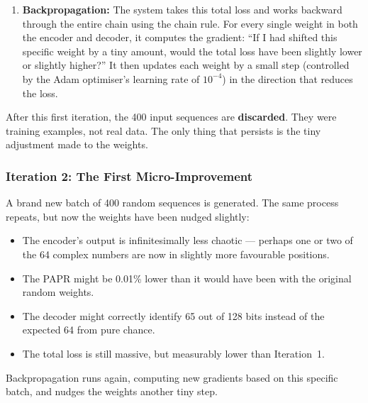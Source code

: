 \begin{enumerate}
\begin{itemize}
              \item \textbf{PAPR loss $\mathcal{L}_2$:} The PAPR of the time-domain waveform is very high (often equivalent to 10+ dB when expressed in dB).
              \item \textbf{Total loss:} $\mathcal{L} = \mathcal{L}_1 + 0.01 \times \mathcal{L}_2$ = a very large number.
          \end{itemize}
    \item \textbf{Backpropagation:} The system takes this total loss and works backward through the entire chain using the chain rule.  For every single weight in both the encoder and decoder, it computes the gradient: ``If I had shifted this specific weight by a tiny amount, would the total loss have been slightly lower or slightly higher?''  It then updates each weight by a small step (controlled by the Adam optimiser's learning rate of $10^{-4}$) in the direction that reduces the loss.
\end{enumerate}

After this first iteration, the 400 input sequences are \textbf{discarded}. They were training examples, not real data.  The only thing that persists is the tiny adjustment made to the weights.

\subsubsection{Iteration 2: The First Micro-Improvement}

A brand new batch of 400 random sequences is generated.  The same process repeats, but now the weights have been nudged slightly:

\begin{itemize}
    \item The encoder's output is infinitesimally less chaotic --- perhaps one or two of the 64 complex numbers are now in slightly more favourable positions.
    \item The PAPR might be 0.01\% lower than it would have been with the original random weights.
    \item The decoder might correctly identify 65 out of 128 bits instead of the expected 64 from pure chance.
    \item The total loss is still massive, but measurably lower than Iteration~1.
\end{itemize}

Backpropagation runs again, computing new gradients based on this specific batch, and nudges the weights another tiny step.


